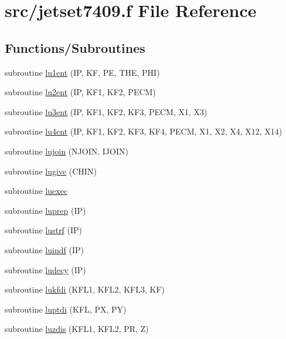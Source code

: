 \hypertarget{jetset7409_8f}{}\section{src/jetset7409.f File Reference}
\label{jetset7409_8f}
\subsection*{Functions/\+Subroutines}
\begin{DoxyCompactItemize}
\item 
subroutine \hyperlink{jetset7409_8f_a86278289cc543712468eeffdc4735d47}{lu1ent} (IP, KF, PE, T\+HE, P\+HI)
\item 
subroutine \hyperlink{jetset7409_8f_af39d115696df4bbd1a85af522582079b}{lu2ent} (IP, K\+F1, K\+F2, P\+E\+CM)
\item 
subroutine \hyperlink{jetset7409_8f_a9286761f10ca7de813e25e275d46c1f6}{lu3ent} (IP, K\+F1, K\+F2, K\+F3, P\+E\+CM, X1, X3)
\item 
subroutine \hyperlink{jetset7409_8f_a6afb1abf3d0ab5082a468f71d57c453d}{lu4ent} (IP, K\+F1, K\+F2, K\+F3, K\+F4, P\+E\+CM, X1, X2, X4, X12, X14)
\item 
subroutine \hyperlink{jetset7409_8f_a45012f3eb334e330854541b974894d86}{lujoin} (N\+J\+O\+IN, I\+J\+O\+IN)
\item 
subroutine \hyperlink{jetset7409_8f_a4f22ba9fbddac5867a0bcc565e521513}{lugive} (C\+H\+IN)
\item 
subroutine \hyperlink{jetset7409_8f_a5b4b744833efbda90c865012826ff281}{luexec}
\item 
subroutine \hyperlink{jetset7409_8f_aad1b09d3910be6e5fd985cf9a9860fc5}{luprep} (IP)
\item 
subroutine \hyperlink{jetset7409_8f_a5941611caddf798b636f4885a175c69e}{lustrf} (IP)
\item 
subroutine \hyperlink{jetset7409_8f_a0eb013ccdb0ba3b352ebfd4ed8aafa72}{luindf} (IP)
\item 
subroutine \hyperlink{jetset7409_8f_ac4ce13e6008631f348288f05b28e3df9}{ludecy} (IP)
\item 
subroutine \hyperlink{jetset7409_8f_a46954bb4ec2e8b9e55b3dd72f4b8df11}{lukfdi} (K\+F\+L1, K\+F\+L2, K\+F\+L3, KF)
\item 
subroutine \hyperlink{jetset7409_8f_adec49ca8d72a0d30c298eb014457d5fd}{luptdi} (K\+FL, PX, PY)
\item 
subroutine \hyperlink{jetset7409_8f_a3e0cdb14807014a4c99bc53b92ae4fe4}{luzdis} (K\+F\+L1, K\+F\+L2, PR, Z)

\end{DoxyCompactItemize}
